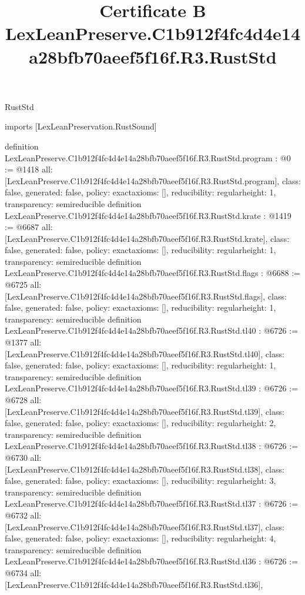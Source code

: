 \begin{lexlean}{RustStd}
\title{Certificate B LexLeanPreserve.C1b912f4fc4d4e14a28bfb70aeef5f16f.R3.RustStd}
\begin{coremodule}
imports [LexLeanPreservation.RustSound]

definition LexLeanPreserve.C1b912f4fc4d4e14a28bfb70aeef5f16f.R3.RustStd.program : @0 := @1418 {
  all: [LexLeanPreserve.C1b912f4fc4d4e14a28bfb70aeef5f16f.R3.RustStd.program],
  class: false,
  generated: false,
  policy: exact{axioms: []},
  reducibility: regular{height: 1},
  transparency: semireducible
}
definition LexLeanPreserve.C1b912f4fc4d4e14a28bfb70aeef5f16f.R3.RustStd.krate : @1419 := @6687 {
  all: [LexLeanPreserve.C1b912f4fc4d4e14a28bfb70aeef5f16f.R3.RustStd.krate],
  class: false,
  generated: false,
  policy: exact{axioms: []},
  reducibility: regular{height: 1},
  transparency: semireducible
}
definition LexLeanPreserve.C1b912f4fc4d4e14a28bfb70aeef5f16f.R3.RustStd.flags : @6688 := @6725 {
  all: [LexLeanPreserve.C1b912f4fc4d4e14a28bfb70aeef5f16f.R3.RustStd.flags],
  class: false,
  generated: false,
  policy: exact{axioms: []},
  reducibility: regular{height: 1},
  transparency: semireducible
}
definition LexLeanPreserve.C1b912f4fc4d4e14a28bfb70aeef5f16f.R3.RustStd.tl40 : @6726 := @1377 {
  all: [LexLeanPreserve.C1b912f4fc4d4e14a28bfb70aeef5f16f.R3.RustStd.tl40],
  class: false,
  generated: false,
  policy: exact{axioms: []},
  reducibility: regular{height: 1},
  transparency: semireducible
}
definition LexLeanPreserve.C1b912f4fc4d4e14a28bfb70aeef5f16f.R3.RustStd.tl39 : @6726 := @6728 {
  all: [LexLeanPreserve.C1b912f4fc4d4e14a28bfb70aeef5f16f.R3.RustStd.tl39],
  class: false,
  generated: false,
  policy: exact{axioms: []},
  reducibility: regular{height: 2},
  transparency: semireducible
}
definition LexLeanPreserve.C1b912f4fc4d4e14a28bfb70aeef5f16f.R3.RustStd.tl38 : @6726 := @6730 {
  all: [LexLeanPreserve.C1b912f4fc4d4e14a28bfb70aeef5f16f.R3.RustStd.tl38],
  class: false,
  generated: false,
  policy: exact{axioms: []},
  reducibility: regular{height: 3},
  transparency: semireducible
}
definition LexLeanPreserve.C1b912f4fc4d4e14a28bfb70aeef5f16f.R3.RustStd.tl37 : @6726 := @6732 {
  all: [LexLeanPreserve.C1b912f4fc4d4e14a28bfb70aeef5f16f.R3.RustStd.tl37],
  class: false,
  generated: false,
  policy: exact{axioms: []},
  reducibility: regular{height: 4},
  transparency: semireducible
}
definition LexLeanPreserve.C1b912f4fc4d4e14a28bfb70aeef5f16f.R3.RustStd.tl36 : @6726 := @6734 {
  all: [LexLeanPreserve.C1b912f4fc4d4e14a28bfb70aeef5f16f.R3.RustStd.tl36],
}
\end{coremodule}
\end{lexlean}
